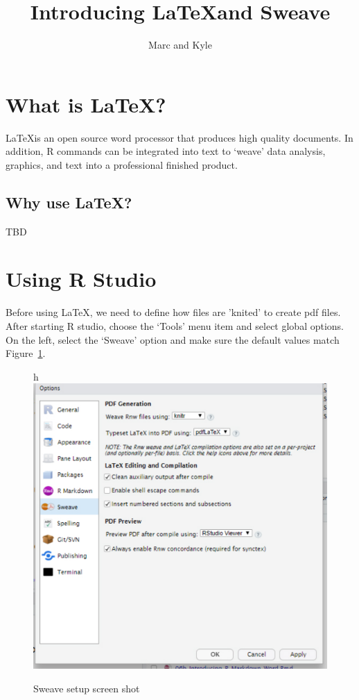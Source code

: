 \documentclass{article}\usepackage[]{graphicx}\usepackage[]{color}
\title{Introducing \LaTeX and Sweave}
\author{Marc and Kyle}
\begin{document}
\maketitle


\section{What is \LaTeX?}

\LaTeX is an open source word processor that produces high quality documents. In addition, R commands can be integrated into text to  `weave' data analysis, graphics, and text into a professional finished product.

\subsection{Why use \LaTeX?}

TBD

\section{Using R Studio}

Before using \LaTeX, we need to define how files are 'knited' to create pdf files. After starting R studio, choose the  `Tools' menu item and select global options. On the left, select the `Sweave' option and make sure the default values match Figure~\ref{fig:sweave}. 

\begin{figure}{h}
\includegraphics[width=\textwidth]{graphics/Sweave_setup}
\caption{Sweave setup screen shot}
\label{fig:sweave}
\end{figure}
\end{document}

